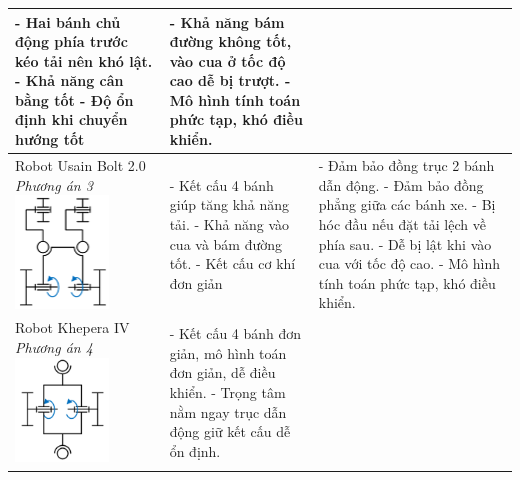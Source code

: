 \begin{longtable}{|p{4cm}|p{5cm}|p{5cm}|}
                - Hai bánh chủ động phía trước kéo tải nên khó lật. \newline
                - Khả năng cân bằng tốt \newline
                - Độ ổn định khi chuyển hướng tốt & 
                - Khả năng bám đường không tốt, vào cua ở tốc độ cao dễ bị trượt. \newline
                - Mô hình tính toán phức tạp, khó điều khiển. \\
                \hline
                Robot Usain Bolt 2.0 \newline
                \textit{Phương án 3} \newline
                \includegraphics[width=2.5cm]{pictures/robot_usain.png} & 
                - Kết cấu 4 bánh giúp tăng khả năng tải. \newline
                - Khả năng vào cua và bám đường tốt. \newline
                - Kết cấu cơ khí đơn giản & 
                - Đảm bảo đồng trục 2 bánh dẫn động. \newline
                - Đảm bảo đồng phẳng giữa các bánh xe. \newline
                - Bị hóc đầu nếu đặt tải lệch về phía sau. \newline
                - Dễ bị lật khi vào cua với tốc độ cao. \newline
                - Mô hình tính toán phức tạp, khó điều khiển. \\
                \hline
                Robot Khepera IV \newline
                \textit{Phương án 4} \newline
                \includegraphics[width=2.5cm]{pictures/robot_khepera_IV.png} &
                - Kết cấu 4 bánh đơn giản, mô hình toán đơn giản, dễ điều khiển.\newline 
                - Trọng tâm nằm ngay trục dẫn động giữ kết cấu dễ ổn định. &

\end{longtable}

